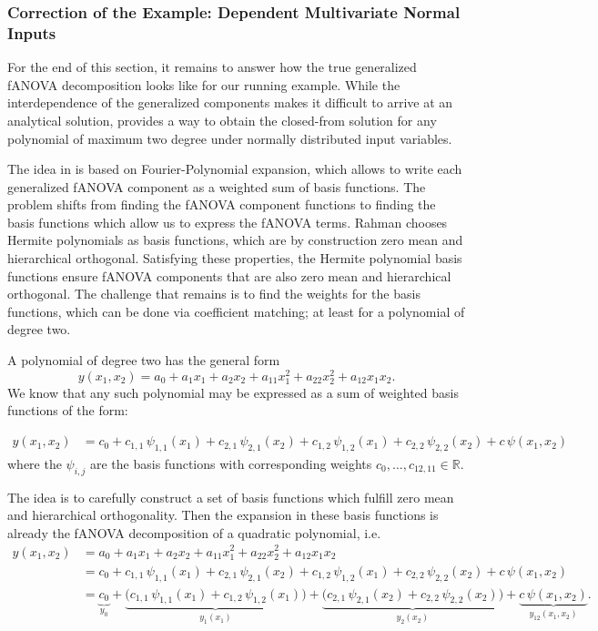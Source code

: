 \subsubsection{Correction of the Example: Dependent Multivariate Normal Inputs}
For the end of this section, it remains to answer how the true generalized fANOVA decomposition looks like for our running example.
While the interdependence of the generalized components makes it difficult to arrive at an analytical solution, \cite{rahman2014} provides a way to obtain the closed-from solution for any polynomial of maximum two degree under normally distributed input variables.\par

The idea in \cite{rahman2014} is based on Fourier-Polynomial expansion, which allows to write each generalized fANOVA component as a weighted sum of basis functions. 
The problem shifts from finding the fANOVA component functions to finding the basis functions which allow us to express the fANOVA terms.
Rahman chooses Hermite polynomials as basis functions, which are by construction zero mean and hierarchical orthogonal. Satisfying these properties, the Hermite polynomial basis functions ensure fANOVA components that are also zero mean and hierarchical orthogonal.
The challenge that remains is to find the weights for the basis functions, which can be done via coefficient matching; at least for a polynomial of degree two.

A polynomial of degree two has the general form
$$y(x_1,x_2) = a_0 + a_1 x_1 + a_2 x_2 + a_{11} x_1^2 + a_{22} x_2^2 + a_{12} x_1 x_2.$$
We know that any such polynomial may be expressed as a sum of weighted basis functions \cite{nagler2024linalg} of the form:

\begin{align*}
y(x_1,x_2) 
&= c_0 
  + c_{1,1}\,\psi_{1,1}(x_1) 
  + c_{2,1}\,\psi_{2,1}(x_2)
  + c_{1,2}\,\psi_{1,2}(x_1)
  + c_{2,2}\,\psi_{2,2}(x_2)
  + c\,\psi(x_1,x_2)
\end{align*}
where the $\psi_{i,j}$ are the basis functions with corresponding weights $c_0, \dots , c_{12, 11} \in \mathbb{R}$.

The idea is to carefully construct a set of basis functions which fulfill zero mean 
and hierarchical orthogonality. Then the expansion in these basis functions is already the 
fANOVA decomposition of a quadratic polynomial, i.e.
\begin{align*}
y(x_1,x_2) 
&= a_0 + a_1 x_1 + a_2 x_2 + a_{11} x_1^2 + a_{22} x_2^2 + a_{12} x_1 x_2 \\[3pt]
&= c_0 
  + c_{1,1}\,\psi_{1,1}(x_1) 
  + c_{2,1}\,\psi_{2,1}(x_2)
  + c_{1,2}\,\psi_{1,2}(x_1)
  + c_{2,2}\,\psi_{2,2}(x_2)
  + c\,\psi(x_1,x_2) \\[3pt]
&= 
\underbrace{c_0}_{y_0}
+ \underbrace{\big(c_{1,1}\,\psi_{1,1}(x_1) 
                + c_{1,2}\,\psi_{1,2}(x_1)\big)}_{y_1(x_1)}
+ \underbrace{\big(c_{2,1}\,\psi_{2,1}(x_2) 
                + c_{2,2}\,\psi_{2,2}(x_2)\big)}_{y_2(x_2)}
+ \underbrace{c\,\psi(x_1,x_2)}_{y_{12}(x_1,x_2)}.
\end{align*}


